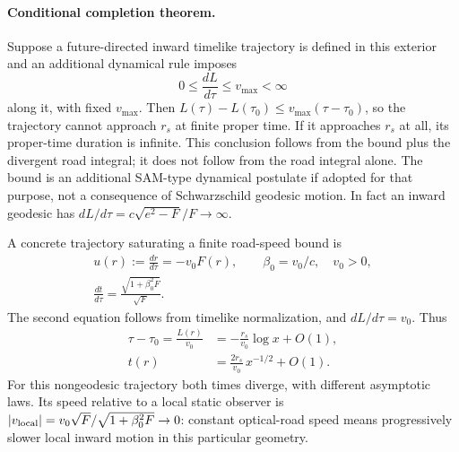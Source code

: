 \documentclass[10pt,twocolumn,letterpaper]{article}
\begin{document}
\paragraph{Conditional completion theorem.}
Suppose a future-directed inward timelike trajectory is defined in this
exterior and an additional dynamical rule imposes
\begin{equation}
 0\leq\frac{dL}{d\tau}\leq v_{\max}<\infty
 \label{eq:ch5-road-speed-postulate}
\end{equation}
along it, with fixed $v_{\max}$. Then
$L(\tau)-L(\tau_0)\leq v_{\max}(\tau-\tau_0)$, so the trajectory
cannot approach $r_s$ at finite proper time. If it approaches $r_s$ at all,
its proper-time duration is infinite. This conclusion follows from the
bound plus the divergent road integral; it does not follow from the road
integral alone. The bound is an additional SAM-type dynamical postulate
if adopted for that purpose, not a consequence of Schwarzschild geodesic
motion. In fact an inward geodesic has
$dL/d\tau=c\sqrt{e^2-F}/F\to\infty$.

A concrete trajectory saturating a finite road-speed bound is
\begin{equation}
 \begin{gathered}
 u(r):=\frac{dr}{d\tau}=-v_0F(r),\qquad \beta_0=v_0/c,\quad v_0>0,\\
 \frac{dt}{d\tau}=\frac{\sqrt{1+\beta_0^2F}}{\sqrt F}.
 \end{gathered}
 \label{eq:ch5-road-trajectory}
\end{equation}
The second equation follows from timelike normalization, and
$dL/d\tau=v_0$. Thus
\begin{equation}
 \begin{aligned}
 \tau-\tau_0=\frac{L(r)}{v_0}&=-\frac{r_s}{v_0}\log x+O(1),\\
 t(r)&=\frac{2r_s}{v_0}\,x^{-1/2}+O(1).
 \end{aligned}
 \label{eq:ch5-road-time-asymptotics}
\end{equation}
For this nongeodesic trajectory both times diverge, with different
asymptotic laws. Its speed relative to a local static observer is
$|v_{\rm local}|=v_0\sqrt F/\sqrt{1+\beta_0^2F}\to0$:
constant optical-road speed means progressively slower local inward
motion in this particular geometry.
\end{document}
